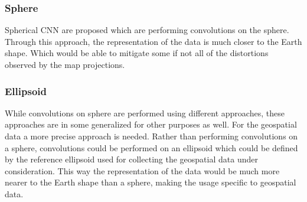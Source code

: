 \subsubsection{Sphere}
Spherical CNN \cite{cohen2018spherical} are proposed which are performing convolutions on the sphere. Through this approach,
the representation of the data is much closer to the Earth shape.
Which would be able to mitigate some if not all of the distortions observed by the map projections.


\subsubsection{Ellipsoid}
While convolutions on sphere are performed using different approaches, these approaches are in some generalized for other purposes as well. For the geospatial data a more precise approach is needed.
Rather than performing convolutions on a sphere, convolutions could be performed on an ellipsoid which could be defined by the reference ellipsoid used for collecting the geospatial data under consideration.
This way the representation of the data would be much more nearer to the Earth shape than a sphere, making the usage specific to geospatial data.

